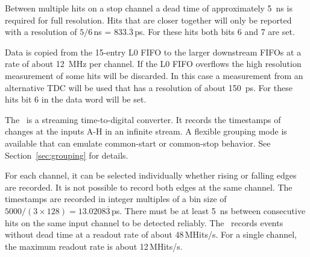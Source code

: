 {    Between multiple hits on a stop channel a dead time of approximately
    \SI{5}{\nano\second} is required for full resolution.  Hits that are
    closer together will only be reported with a resolution of
    $5/6$\,ns = $833.\overline{3}$\,ps. For these
    hits both bits 6 and 7 are set.

    Data is copied from the 15-entry L0 FIFO to the larger downstream FIFOs at
    a rate of about \SI{12}{\mega\hertz} per channel.  If the L0 FIFO
    overflows the high resolution measurement of some hits will be discarded. 
    In this case a measurement from an alternative TDC will be used that has a
    resolution of about \SI{150}{\pico\second}.  For these hits bit 6 in the
    data word will be set.
} { %
    The \deviceName\ is a streaming time-to-digital converter. It records the
    timestamps of changes at the inputs A-H in an infinite stream.  A flexible
    grouping mode is available that can emulate common-start or common-stop
    behavior. See Section~\ref{sec:grouping} for details.

    For each channel, it can be selected individually whether rising or
    falling edges are recorded. It is not possible to record both edges at the
    same channel.  The timestamps are recorded in integer multiples of a bin
    size of $5000/(3\times 128) = 13.0208\overline{3}$\,ps. 
    There must be at least \SI{5}{\nano\second} between consecutive hits on
    the same input channel to be detected reliably.  The \deviceName\ records
    events without dead time at a readout rate of about 48\,MHits/s. For a
    single channel, the maximum readout rate is about 12\,MHits/s.
}